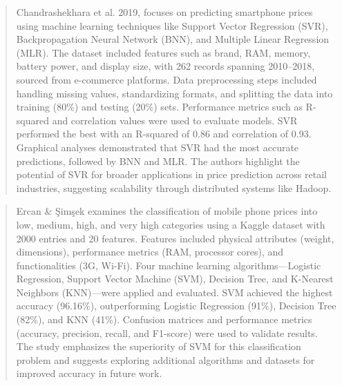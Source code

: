 \documentclass[12pt]{report}
\begin{document}
\begin{quotation}
  Chandrashekhara et al. \cite{chandrashekhara2019} 2019, focuses on predicting smartphone prices using machine learning techniques like Support Vector Regression (SVR), Backpropagation Neural Network (BNN), and Multiple Linear Regression (MLR). The dataset included features such as brand, RAM, memory, battery power, and display size, with 262 records spanning 2010–2018, sourced from e-commerce platforms. Data preprocessing steps included handling missing values, standardizing formats, and splitting the data into training (80\%) and testing (20\%) sets. Performance metrics such as R-squared and correlation values were used to evaluate models. SVR performed the best with an R-squared of 0.86 and correlation of 0.93. Graphical analyses demonstrated that SVR had the most accurate predictions, followed by BNN and MLR. The authors highlight the potential of SVR for broader applications in price prediction across retail industries, suggesting scalability through distributed systems like Hadoop.
\end{quotation}

\begin{quotation}
  Ercan \& Şimşek \cite{ercan2023} examines the classification of mobile phone prices into low, medium, high, and very high categories using a Kaggle dataset with 2000 entries and 20 features. Features included physical attributes (weight, dimensions), performance metrics (RAM, processor cores), and functionalities (3G, Wi-Fi). Four machine learning algorithms—Logistic Regression, Support Vector Machine (SVM), Decision Tree, and K-Nearest Neighbors (KNN)—were applied and evaluated. SVM achieved the highest accuracy (96.16\%), outperforming Logistic Regression (91\%), Decision Tree (82\%), and KNN (41\%). Confusion matrices and performance metrics (accuracy, precision, recall, and F1-score) were used to validate results. The study emphasizes the superiority of SVM for this classification problem and suggests exploring additional algorithms and datasets for improved accuracy in future work.
\end{quotation}
\end{document}
